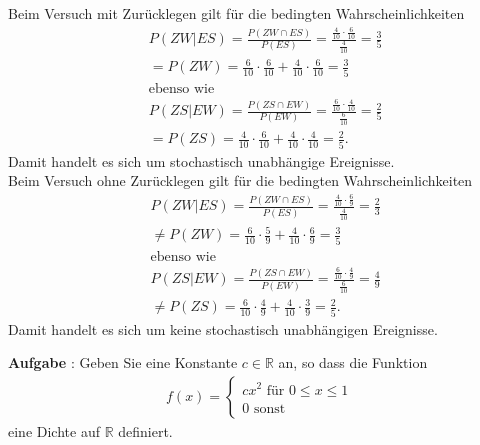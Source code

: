 \documentclass[a4paper,13pt]{scrartcl}
\newcommand{\exercise}{\vspace*{0.2cm}
\stepcounter{aufgabe}
\noindent
\textbf{Aufgabe \arabic{aufgabe}}: }
\newcounter{aufgabe}
\begin{document}
Beim Versuch mit Zurücklegen gilt für die bedingten Wahrscheinlichkeiten 
\begin{align*}
    & P(ZW|ES) = \frac{P(ZW \cap ES)}{P(ES)} = \frac{\frac{4}{10} \cdot \frac{6}{10}}{\frac{4}{10}} = \frac{3}{5}\\
    & = P(ZW) = \frac{6}{10} \cdot \frac{6}{10} + \frac{4}{10} \cdot \frac{6}{10} = \frac{3}{5}\\
    & \text{ebenso wie}\\
    & P(ZS|EW) = \frac{P(ZS \cap EW)}{P(EW)} = \frac{\frac{6}{10} \cdot \frac{4}{10}}{\frac{6}{10}} = \frac{2}{5}\\
    & = P(ZS) = \frac{4}{10} \cdot \frac{6}{10} + \frac{4}{10} \cdot \frac{4}{10} = \frac{2}{5} \text{.}
\end{align*}
Damit handelt es sich um stochastisch unabhängige Ereignisse.\\
Beim Versuch ohne Zurücklegen gilt für die bedingten Wahrscheinlichkeiten
\begin{align*}
    & P(ZW|ES) = \frac{P(ZW \cap ES)}{P(ES)} = \frac{\frac{4}{10} \cdot \frac{6}{9}}{\frac{4}{10}} = \frac{2}{3}\\
    & \neq P(ZW) = \frac{6}{10} \cdot \frac{5}{9} + \frac{4}{10} \cdot \frac{6}{9} = \frac{3}{5}\\
    & \text{ebenso wie}\\
    & P(ZS|EW) = \frac{P(ZS \cap EW)}{P(EW)} = \frac{\frac{6}{10} \cdot \frac{4}{9}}{\frac{6}{10}} = \frac{4}{9}\\
    & \neq P(ZS) = \frac{6}{10} \cdot \frac{4}{9} + \frac{4}{10} \cdot \frac{3}{9} = \frac{2}{5} \text{.}
\end{align*}
Damit handelt es sich um keine stochastisch unabhängigen Ereignisse.
\vspace{8mm}

\newpage
\exercise
Geben Sie eine Konstante $c  \in \mathbb{R}$ an, so dass die Funktion 
\begin{align*}
f(x) = \begin{cases} c x^2 \text{ für }  0\leq x \leq 1 \\ 0 \text{ sonst}\end{cases}
\end{align*}
eine Dichte auf $\mathbb{R}$ definiert.
\vspace{4mm}
\end{document}

